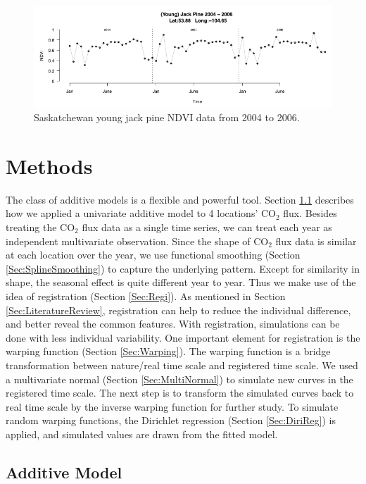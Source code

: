 \documentclass{article}\usepackage[]{graphicx}\usepackage[]{color}
\begin{document}
\begin{figure}[!ht]
\centering
\includegraphics[width=14cm]{yjpndvi.png}
\caption{Saskatchewan young jack pine NDVI data from 2004 to 2006.}
\label{Fig:yjpndvi}
\end{figure}

\section{Methods}\label{Sec:Methods}

The class of additive models is a flexible and powerful tool. Section \ref{Sec:AddModel} describes how we applied a univariate additive model to 4 locations' CO$_2$ flux. Besides treating the CO$_2$ flux data as a single time series, we can treat each year as independent multivariate observation. Since the shape of CO$_2$ flux data is similar at each location over the year, we use functional smoothing (Section \ref{Sec:SplineSmoothing}) to capture the underlying pattern.  Except for similarity in shape, the seasonal effect is quite different year to year. Thus we make use of the idea of registration (Section \ref{Sec:Regi}). As mentioned in Section \ref{Sec:LiteratureReview}, registration can help to reduce the individual difference, and better reveal the common features. With registration, simulations can be done with less individual variability. One important element for registration is the warping function (Section \ref{Sec:Warping}). The warping function is a bridge transformation between nature/real time scale and registered time scale. We used a multivariate normal (Section \ref{Sec:MultiNormal}) to simulate new curves in the registered time scale. The next step is to transform the simulated curves back to real time scale by the inverse warping function for further study.  To simulate random warping functions, the Dirichlet regression (Section \ref{Sec:DiriReg}) is applied, and simulated values are drawn from the fitted model.


\subsection{Additive Model}\label{Sec:AddModel}
\end{document}
